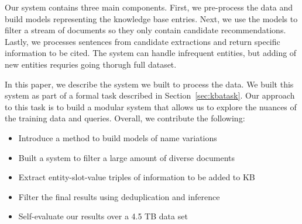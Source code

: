Our system contains three main components. First, we pre-process the data and build models representing the knowledge base entries. Next, we use the models to filter a stream of documents so they only contain 
candidate recommendations. Lastly, we processes sentences from candidate extractions and return specific information to be cited. The system can handle infrequent entities, but adding of new entities requries going thorugh full dataset.


In this paper, we describe the system we built to process the data. We built this system as part of a formal task described in Section~\ref{sec:kbatask}. Our approach to this task is to build a modular system
that allows us to explore the nuances of the training data and queries. Overall, we contribute the following:
\begin{itemize}[noitemsep,nolistsep]
\item Introduce a method to build models of name variations %
\item Built a system to filter a large amount of diverse documents %
\item Extract entity-slot-value triples of information to be added to KB %
\item Filter the final results using deduplication and inference %
\item Self-evaluate our results over a 4.5 TB data set %
\end{itemize}





